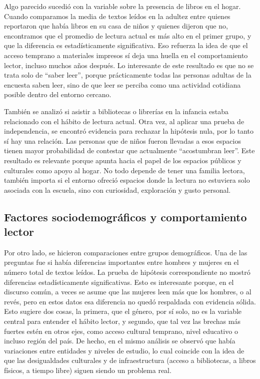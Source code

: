\documentclass[aps,reprint]{revtex4-2}
\begin{document}
Algo parecido sucedió con la variable sobre la presencia de libros en el hogar. Cuando comparamos la media de textos leídos en la adultez entre quienes reportaron que había libros en su casa de niños y quienes dijeron que no, encontramos que el promedio de lectura actual es más alto en el primer grupo, y que la diferencia es estadísticamente significativa. Eso refuerza la idea de que el acceso temprano a materiales impresos sí deja una huella en el comportamiento lector, incluso muchos años después. Lo interesante de este resultado es que no se trata solo de “saber leer”, porque prácticamente todas las personas adultas de la encuesta saben leer, sino de que leer se perciba como una actividad cotidiana posible dentro del entorno cercano.

También se analizó si asistir a bibliotecas o librerías en la infancia estaba relacionado con el hábito de lectura actual. Otra vez, al aplicar una prueba de independencia, se encontró evidencia para rechazar la hipótesis nula, por lo tanto sí hay una relación. Las personas que de niños fueron llevadas a esos espacios tienen mayor probabilidad de contestar que actualmente “acostumbran leer”. Este resultado es relevante porque apunta hacia el papel de los espacios públicos y culturales como apoyo al hogar. No todo depende de tener una familia lectora, también importa si el entorno ofreció espacios donde la lectura no estuviera solo asociada con la escuela, sino con curiosidad, exploración y gusto personal.

\subsection*{Factores sociodemográficos y comportamiento lector}

Por otro lado, se hicieron comparaciones entre grupos demográficos. Una de las preguntas fue si había diferencias importantes entre hombres y mujeres en el número total de textos leídos. La prueba de hipótesis correspondiente no mostró diferencias estadísticamente significativas. Esto es interesante porque, en el discurso común, a veces se asume que las mujeres leen más que los hombres, o al revés, pero en estos datos esa diferencia no quedó respaldada con evidencia sólida. Esto sugiere dos cosas, la primera, que el género, por sí solo, no es la variable central para entender el hábito lector, y segundo, que tal vez las brechas más fuertes estén en otros ejes, como acceso cultural temprano, nivel educativo o incluso región del país. De hecho, en el mismo análisis se observó que había variaciones entre entidades y niveles de estudio, lo cual coincide con la idea de que las desigualdades culturales y de infraestructura (acceso a bibliotecas, a libros físicos, a tiempo libre) siguen siendo un problema real.
\end{document}
